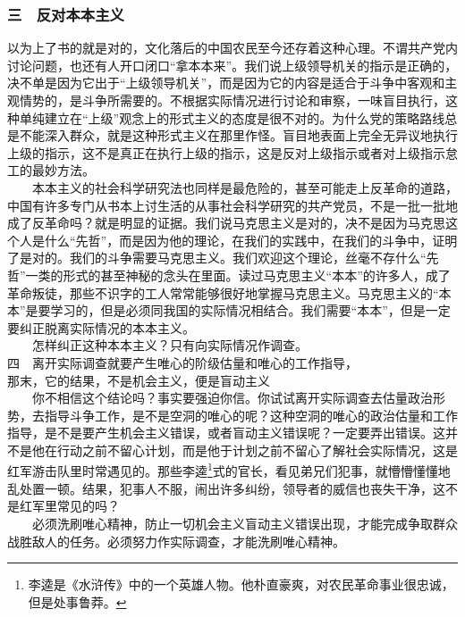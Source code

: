 \documentclass[cn,11pt,chinese]{elegantbook}
\def\myformat#1{\hfil\hfil #1}
\begin{document}
\subsubsection*{\myformat{三　反对本本主义}}
以为上了书的就是对的，文化落后的中国农民至今还存着这种心理。不谓共产党内讨论问题，也还有人开口闭口“拿本本来”。我们说上级领导机关的指示是正确的，决不单是因为它出于“上级领导机关”，而是因为它的内容是适合于斗争中客观和主观情势的，是斗争所需要的。不根据实际情况进行讨论和审察，一味盲目执行，这种单纯建立在“上级”观念上的形式主义的态度是很不对的。为什么党的策略路线总是不能深入群众，就是这种形式主义在那里作怪。盲目地表面上完全无异议地执行上级的指示，这不是真正在执行上级的指示，这是反对上级指示或者对上级指示怠工的最妙方法。\\
　　本本主义的社会科学研究法也同样是最危险的，甚至可能走上反革命的道路，中国有许多专门从书本上讨生活的从事社会科学研究的共产党员，不是一批一批地成了反革命吗？就是明显的证据。我们说马克思主义是对的，决不是因为马克思这个人是什么“先哲”，而是因为他的理论，在我们的实践中，在我们的斗争中，证明了是对的。我们的斗争需要马克思主义。我们欢迎这个理论，丝毫不存什么“先哲”一类的形式的甚至神秘的念头在里面。读过马克思主义“本本”的许多人，成了革命叛徒，那些不识字的工人常常能够很好地掌握马克思主义。马克思主义的“本本”是要学习的，但是必须同我国的实际情况相结合。我们需要“本本”，但是一定要纠正脱离实际情况的本本主义。\\
　　怎样纠正这种本本主义？只有向实际情况作调查。\\
四　离开实际调查就要产生唯心的阶级估量和唯心的工作指导，\\
那末，它的结果，不是机会主义，便是盲动主义\\
　　你不相信这个结论吗？事实要强迫你信。你试试离开实际调查去估量政治形势，去指导斗争工作，是不是空洞的唯心的呢？这种空洞的唯心的政治估量和工作指导，是不是要产生机会主义错误，或者盲动主义错误呢？一定要弄出错误。这并不是他在行动之前不留心计划，而是他于计划之前不留心了解社会实际情况，这是红军游击队里时常遇见的。那些李逵\footnote[3]{ 李逵是《水浒传》中的一个英雄人物。他朴直豪爽，对农民革命事业很忠诚，但是处事鲁莽。}式的官长，看见弟兄们犯事，就懵懵懂懂地乱处置一顿。结果，犯事人不服，闹出许多纠纷，领导者的威信也丧失干净，这不是红军里常见的吗？\\
　　必须洗刷唯心精神，防止一切机会主义盲动主义错误出现，才能完成争取群众战胜敌人的任务。必须努力作实际调查，才能洗刷唯心精神。\\
\end{document}

